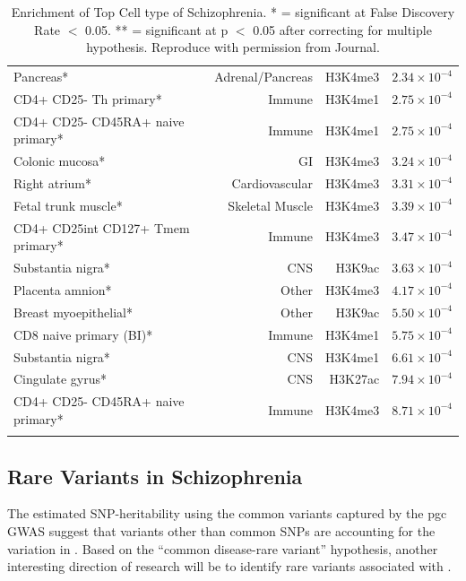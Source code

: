 \documentclass[12pt]{scrbook}
\newcommand*{\glng}{\glsentrylong}
\begin{document}
\begin{singlespace}
\begin{longtable}{p{6cm}rrr}
			Pancreas* & Adrenal/Pancreas & H3K4me3 & $2.34\times 10^{-4}$ \\
			CD4+ CD25- Th primary* & Immune & H3K4me1 & $2.75\times 10^{-4}$ \\
			CD4+ CD25- CD45RA+ naive primary* & Immune & H3K4me1 & $2.75\times 10^{-4}$\\
			Colonic mucosa* & GI    & H3K4me3 & $3.24\times 10^{-4}$ \\
			Right atrium* & Cardiovascular & H3K4me3 & $3.31\times 10^{-4}$ \\
			Fetal trunk muscle* & Skeletal Muscle & H3K4me3 & $3.39\times 10^{-4}$ \\
			CD4+ CD25int CD127+ Tmem primary* & Immune & H3K4me3 & $3.47\times 10^{-4}$ \\
			Substantia nigra* & CNS   & H3K9ac & $3.63\times 10^{-4}$ \\
			Placenta amnion* & Other & H3K4me3 & $4.17\times 10^{-4}$ \\
			Breast myoepithelial* & Other & H3K9ac & $5.50\times 10^{-4}$ \\
			CD8 naive primary (BI)* & Immune & H3K4me1 & $5.75\times 10^{-4}$ \\
			Substantia nigra* & CNS   & H3K4me1 & $6.61\times 10^{-4}$ \\
			Cingulate gyrus* & CNS   & H3K27ac & $7.94\times 10^{-4}$ \\
			CD4+ CD25- CD45RA+ naive primary* & Immune & H3K4me3 & $8.71\times 10^{-4}$ \\
			\bottomrule
			\caption[Enrichment of Top Cell Type of Schizophrenia]{Enrichment of Top Cell type of Schizophrenia.
				* = significant at False Discovery Rate $<$ 0.05.
				** = significant at p $<$ 0.05 after correcting for multiple hypothesis. 
				Reproduce with permission from Journal.\citep{Finucane2015}}
			\label{tab:cellTypeScz}%
		\end{longtable}%
	\end{singlespace}
	
	\subsection{Rare Variants in Schizophrenia}
	The estimated \gls{SNP}-heritability using the common variants captured by the \gls{pgc} \glng{scz} \gls{GWAS} suggest that variants other than common \glspl{SNP} are accounting for the variation in \glng{scz}.
	Based on the ``common disease-rare variant'' hypothesis, another interesting direction of \glng{scz} research will be to identify rare variants associated with \glng{scz}.
	
\end{document}
